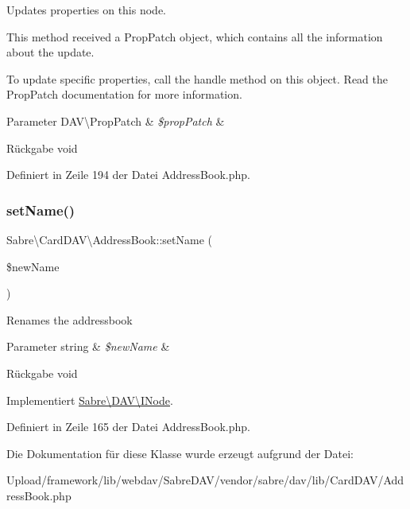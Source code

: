 Updates properties on this node.

This method received a Prop\+Patch object, which contains all the information about the update.

To update specific properties, call the \textquotesingle{}handle\textquotesingle{} method on this object. Read the Prop\+Patch documentation for more information.


\begin{DoxyParams}[1]{Parameter}
D\+A\+V\textbackslash{}\+Prop\+Patch & {\em \$prop\+Patch} & \\
\hline
\end{DoxyParams}
\begin{DoxyReturn}{Rückgabe}
void 
\end{DoxyReturn}


Definiert in Zeile 194 der Datei Address\+Book.\+php.

\mbox{\label{class_sabre_1_1_card_d_a_v_1_1_address_book_a2a642797fd5aaf056145b4cde8301514}} 
\subsubsection{\texorpdfstring{set\+Name()}{setName()}}
{\footnotesize\ttfamily Sabre\textbackslash{}\+Card\+D\+A\+V\textbackslash{}\+Address\+Book\+::set\+Name (\begin{DoxyParamCaption}\item[{}]{\$new\+Name }\end{DoxyParamCaption})}

Renames the addressbook


\begin{DoxyParams}[1]{Parameter}
string & {\em \$new\+Name} & \\
\hline
\end{DoxyParams}
\begin{DoxyReturn}{Rückgabe}
void 
\end{DoxyReturn}


Implementiert \mbox{\hyperlink{interface_sabre_1_1_d_a_v_1_1_i_node_ac90fa5526e98def2e1f51bc57a772366}{Sabre\textbackslash{}\+D\+A\+V\textbackslash{}\+I\+Node}}.



Definiert in Zeile 165 der Datei Address\+Book.\+php.



Die Dokumentation für diese Klasse wurde erzeugt aufgrund der Datei\+:\begin{DoxyCompactItemize}
\item 
Upload/framework/lib/webdav/\+Sabre\+D\+A\+V/vendor/sabre/dav/lib/\+Card\+D\+A\+V/Address\+Book.\+php\end{DoxyCompactItemize}

